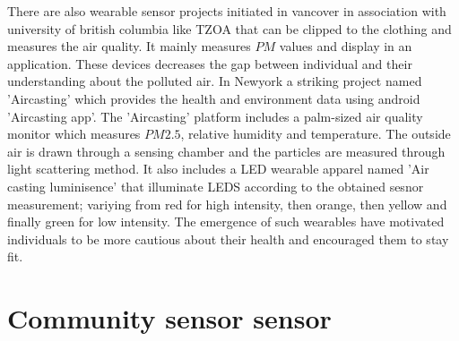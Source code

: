  There are also wearable sensor projects initiated in vancover in association with university of british columbia like TZOA \cite{tzoa} that can be clipped to the clothing and measures the air quality. It mainly measures $PM$ values and display in an application. These devices decreases the gap between individual and their understanding about the polluted air. In Newyork a striking project named 'Aircasting'\cite{aircasting} which provides the health and environment data using android 'Aircasting app'. The 'Aircasting'\cite{Han2010} platform includes a palm-sized air quality monitor which measures $PM2.5$, relative humidity and temperature. The outside air is drawn through a sensing chamber and the particles are measured through light scattering method. It also includes a LED wearable apparel named 'Air casting luminisence'\cite{Luminescence} that illuminate LEDS according to the obtained sesnor measurement; variying from red for high intensity, then orange, then yellow and finally green for low intensity. The emergence of such wearables have motivated individuals to be more cautious about their health and encouraged them to stay fit.



\section{Community sensor sensor}

